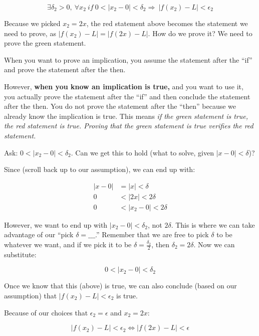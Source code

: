 \documentclass[12pt]{article}
\theoremstyle{plain}
\theoremstyle{remark}
\theoremstyle{definition}
\begin{document}
\[\exists\delta_{2} > 0,\ \forall x_{2}\ if\ 0 < \left| x_{2} - 0 \right| < \delta_{2} \Rightarrow \ \left| f\left( x_{2} \right) - L \right| < \epsilon_{2}\]

Because we picked \(x_{2} = 2x\), the red statement above becomes the
statement we need to prove, as
\(\left| f\left( x_{2} \right) - L \right| = |f(2x) - L|\). How do we
prove it? We need to prove the green statement.

When you want to prove an implication, you assume the statement after
the ``if'' and prove the statement after the then.

However, \textbf{when you know an implication is true,} and you want to
use it, you actually prove the statement after the ``if'' and then
conclude the statement after the then. You do not prove the statement
after the ``then'' because we already know the implication is true. This
means \emph{if the green statement is true, the red statement is true.
Proving that the green statement is true verifies the red statement.}

Ask: \(0 < \left| x_{2} - 0 \right| < \delta_{2}\). Can we get this to
hold (what to solve, given \(|x - 0| < \delta\))?

Since (scroll back up to our assumption), we can end up with:

\begin{align*}
|x - 0| &= |x| < \delta \\
0 &< |2x| < 2\delta \\
0 &< \left| x_{2} - 0 \right| < 2\delta
\end{align*}


However, we want to end up with
\(\left| x_{2} - 0 \right| < \delta_{2}\), not \(2\delta\). This is
where we can take advantage of our ``pick \(\delta = \_\_\_\).''
Remember that we are free to pick \(\delta\) to be whatever we want, and
if we pick it to be \(\delta = \frac{\delta_{2}}{2}\), then
\(\delta_{2} = 2\delta\). Now we can substitute:

\[0 < \left| x_{2} - 0 \right| < \delta_{2}\]

Once we know that this (above) is true, we can also conclude (based on
our assumption) that
\(\left| f\left( x_{2} \right) - L \right| < \epsilon_{2}\) is true.

Because of our choices that \(\epsilon_{2} = \epsilon\) and
\(x_{2} = 2x\):

\[\left| f\left( x_{2} \right) - L \right| < \epsilon_{2} \Leftrightarrow \left| f(2x) - L \right| < \epsilon\]
\end{document}
